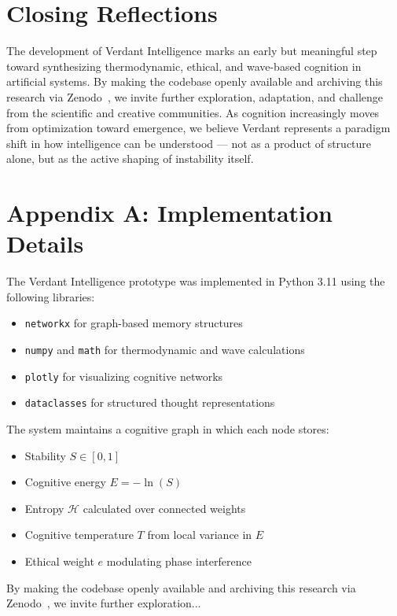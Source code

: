 \documentclass{article}
\begin{document}
\section*{Closing Reflections}

The development of Verdant Intelligence marks an early but meaningful step toward synthesizing thermodynamic, ethical, and wave-based cognition in artificial systems. By making the codebase openly available and archiving this research via Zenodo~\cite{verdant2025}, we invite further exploration, adaptation, and challenge from the scientific and creative communities. As cognition increasingly moves from optimization toward emergence, we believe Verdant represents a paradigm shift in how intelligence can be understood — not as a product of structure alone, but as the active shaping of instability itself.

\section*{Appendix A: Implementation Details}

The Verdant Intelligence prototype was implemented in Python 3.11 using the following libraries:

\begin{itemize}
    \item \texttt{networkx} for graph-based memory structures
    \item \texttt{numpy} and \texttt{math} for thermodynamic and wave calculations
    \item \texttt{plotly} for visualizing cognitive networks
    \item \texttt{dataclasses} for structured thought representations
\end{itemize}

The system maintains a cognitive graph in which each node stores:

\begin{itemize}
    \item Stability $S \in [0, 1]$
    \item Cognitive energy $E = -\ln(S)$
    \item Entropy $\mathcal{H}$ calculated over connected weights
    \item Cognitive temperature $T$ from local variance in $E$
    \item Ethical weight $e$ modulating phase interference
\end{itemize}

By making the codebase openly available and archiving this research via Zenodo~\cite{verdant2025}, we invite further exploration...









\end{document}
